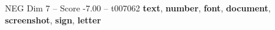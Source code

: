 \begin{textsample}{NEG Dim 7 – Score -7.00 – t007062}  \label{ex:f7_neg_031}
\textbf{text}, \textbf{number}, \textbf{font}, \textbf{document}, \textbf{screenshot}, \textbf{sign}, \textbf{letter}

\end{textsample}
